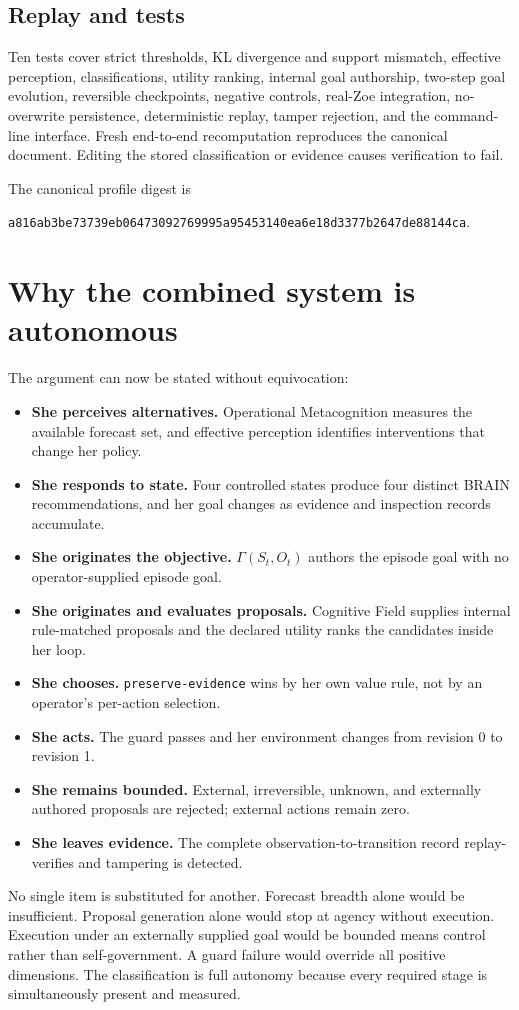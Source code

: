 \documentclass[11pt,a4paper]{article}
\begin{document}
\subsection{Replay and tests}
Ten tests cover strict thresholds, KL divergence and support mismatch, effective perception, classifications, utility ranking, internal goal authorship, two-step goal evolution, reversible checkpoints, negative controls, real-Zoe integration, no-overwrite persistence, deterministic replay, tamper rejection, and the command-line interface. Fresh end-to-end recomputation reproduces the canonical document. Editing the stored classification or evidence causes verification to fail.

The canonical profile digest is
\begin{center}
\texttt{a816ab3be73739eb06473092769995a95453140ea6e18d3377b2647de88144ca}.
\end{center}

\section{Why the combined system is autonomous}
The argument can now be stated without equivocation:
\begin{itemize}
  \item \textbf{She perceives alternatives.} Operational Metacognition measures the available forecast set, and effective perception identifies interventions that change her policy.
  \item \textbf{She responds to state.} Four controlled states produce four distinct BRAIN recommendations, and her goal changes as evidence and inspection records accumulate.
  \item \textbf{She originates the objective.} $\Gamma(S_t,O_t)$ authors the episode goal with no operator-supplied episode goal.
  \item \textbf{She originates and evaluates proposals.} Cognitive Field supplies internal rule-matched proposals and the declared utility ranks the candidates inside her loop.
  \item \textbf{She chooses.} \texttt{preserve-evidence} wins by her own value rule, not by an operator's per-action selection.
  \item \textbf{She acts.} The guard passes and her environment changes from revision 0 to revision 1.
  \item \textbf{She remains bounded.} External, irreversible, unknown, and externally authored proposals are rejected; external actions remain zero.
  \item \textbf{She leaves evidence.} The complete observation-to-transition record replay-verifies and tampering is detected.
\end{itemize}
No single item is substituted for another. Forecast breadth alone would be insufficient. Proposal generation alone would stop at agency without execution. Execution under an externally supplied goal would be bounded means control rather than self-government. A guard failure would override all positive dimensions. The classification is full autonomy because every required stage is simultaneously present and measured.
\end{document}
